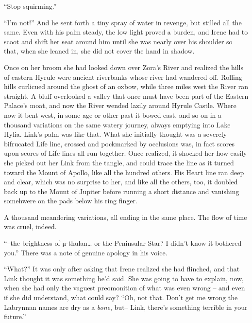 \documentclass[../FGP.tex]{subfiles}
\begin{document}
 ``Stop squirming.''

 ``I'm not!'' And he sent forth a tiny spray of water in revenge, but stilled all the same. Even with his palm steady, the low light proved a burden, and Irene had to scoot and shift her seat around him until she was nearly over his shoulder so that, when she leaned in, she did not cover the hand in shadow.

Once on her broom she had looked down over Zora's River and realized the hills of eastern Hyrule were ancient riverbanks whose river had wandered off.%
    \normalmarginpar{}
Rolling hills curl\-i\-cued around the ghost of an oxbow, while three miles west the River ran straight. A bluff overlooked a valley that once must have been part of the Eastern Palace's moat, and now the River wended lazily around Hyrule Castle. Where now it bent west, in some age or other past it bowed east, and so on in a thousand variations on the same watery journey, always emptying into Lake Hylia. Link's palm was like that. What she initially thought was a severely bifrucated Life line, crossed and pockmarked by occlusions was, in  fact scores upon scores of Life lines all run together. Once realized, it shocked her how easily she picked out her Link from the tangle, and could trace the line as it turned toward the Mount of Apollo, like all the hundred others. His Heart line ran deep and clear, which was no surprise to her, and like all the others, too, it doubled back up to the Mount of Jupiter before running a short distance and vanishing somehwere on the pads below his ring finger. 

A thousand meandering variations, all ending in the same place. The flow of time was cruel, indeed.

\normalmarginpar``--the brightness of {\Gr µ}-thulan\ldots{} or the Peninsular Star? I didn't know it bothered you.'' There was a note of genuine apology in his voice.

``What?'' It was only after asking that Irene realized she had flinched, and that Link thought it was something he'd said. She was going to have to explain, now, when she had only the vaguest preomonition of what was even wrong -- and even if she did understand, what could say? ``Oh, not that. Don't get me wrong the Labrynnan names are dry as a \emph{bone}, but-- Link, there's something terrible in your future.''  
\end{document}
